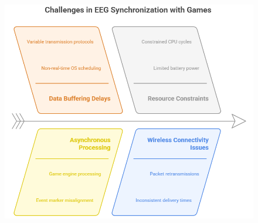 
\begin{figure}
    \centering
    \includegraphics[width=0.8\linewidth]{Figures/state of the art.png}
    \caption{}
    \label{fig:Esquema}
\end{figure}








